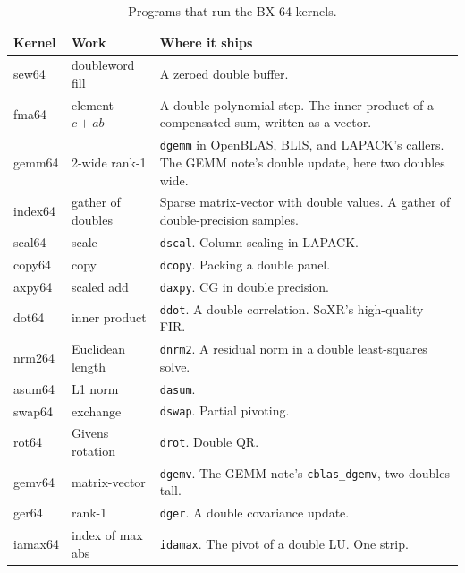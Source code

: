 \begin{table}[htbp]
\centering
\caption{Programs that run the BX-64 kernels.}
\begingroup
\scriptsize
\setlength{\tabcolsep}{3pt}
\begin{tabular}{@{}llp{7.0cm}@{}}
\toprule
Kernel & Work & Where it ships \\
\midrule
sew64 & doubleword fill & A zeroed double buffer. \\
fma64 & element $c + ab$ & A double polynomial step. The inner product of a compensated sum, written as a vector. \\
gemm64 & 2-wide rank-1 & \texttt{dgemm} in OpenBLAS, BLIS, and LAPACK's callers. The GEMM note's double update, here two doubles wide. \\
index64 & gather of doubles & Sparse matrix-vector with double values. A gather of double-precision samples. \\
scal64 & scale & \texttt{dscal}. Column scaling in LAPACK. \\
copy64 & copy & \texttt{dcopy}. Packing a double panel. \\
axpy64 & scaled add & \texttt{daxpy}. CG in double precision. \\
dot64 & inner product & \texttt{ddot}. A double correlation. SoXR's high-quality FIR. \\
nrm264 & Euclidean length & \texttt{dnrm2}. A residual norm in a double least-squares solve. \\
asum64 & L1 norm & \texttt{dasum}. \\
swap64 & exchange & \texttt{dswap}. Partial pivoting. \\
rot64 & Givens rotation & \texttt{drot}. Double QR. \\
gemv64 & matrix-vector & \texttt{dgemv}. The GEMM note's \texttt{cblas\_dgemv}, two doubles tall. \\
ger64 & rank-1 & \texttt{dger}. A double covariance update. \\
iamax64 & index of max abs & \texttt{idamax}. The pivot of a double LU. One strip. \\
\bottomrule
\end{tabular}
\endgroup
\end{table}













